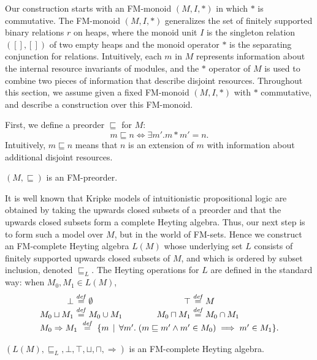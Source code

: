 \documentclass{LMCS}
\newcommand{\defeq}{\stackrel{\mathit{def}}{=}}
\begin{document}
Our construction starts with an FM-monoid $(M,I,*)$ in which
$*$ is commutative.
The FM-monoid $(M,I,*)$ generalizes the set of
finitely supported binary relations $r$ on heaps,
where the monoid unit $I$ 
is the singleton relation ${([],[])}$ of 
two empty heaps and the monoid operator $*$ 
is the separating conjunction
for relations. Intuitively, each $m$ in $M$ represents 
information about the internal resource invariants of modules,
and the $*$ operator of $M$
is used to combine two pieces
of information that describe disjoint resources. 
Throughout this section, we assume given
a fixed FM-monoid $(M,I,*)$ with $*$ commutative,
and describe a construction over this FM-monoid.

First, we define a preorder $\sqsubseteq$ for $M$:
$$
  m \sqsubseteq n \iff
  \exists m'. m*m' = n.
$$
Intuitively, $m\sqsubseteq n$ means that $n$ is an extension
of $m$ with information about additional disjoint resources. 
\begin{lem}
$(M,\sqsubseteq)$ is an FM-preorder.
\end{lem}

It is well known that Kripke models of intuitionistic propositional
logic are obtained by taking the upwards closed subsets of a preorder and
that the upwards closed subsets form a complete Heyting algebra. 
Thus, our next step is to form such a model over 
$M$, but in the world of FM-sets.
Hence we construct an FM-complete Heyting algebra
$L(M)$ whose underlying set $L$ consists
of finitely supported upwards closed subsets of $M$,
and which is ordered by subset inclusion,
denoted $\sqsubseteq_L$. The
Heyting operations for $L$ are defined in the standard way:
when $M_0,M_1 \in L(M)$,
$$
\begin{array}{r@{\;}c@{\;}l@{\qquad\qquad}r@{\;}c@{\;}l}
\bot & \defeq & \emptyset 
&
\top & \defeq & M
\\
M_0 \sqcup M_1 & \defeq & M_0 \cup M_1
&
M_0 \sqcap M_1 & \defeq & M_0 \cap M_1
\\
\multicolumn{6}{c}{
M_0 \Rightarrow M_1 \;\defeq\; 
\{m \,\mid\, \forall m'.\; (m \sqsubseteq m' \wedge m' \in M_0)
\implies m' \in M_1\}.
}
\end{array}
$$
\begin{lem}
$(L(M),\sqsubseteq_L,\bot,\top,\sqcup,\sqcap,\Rightarrow)$
is an FM-complete Heyting algebra.
\end{lem}
\end{document}
